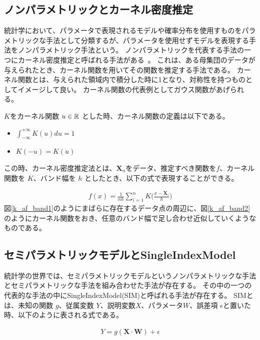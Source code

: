 \subsection{ノンパラメトリックとカーネル密度推定}
統計学において、パラメータで表現されるモデルや確率分布を使用すものをパラメトリックな手法として分類するが、パラメータを使用せずモデルを表現する手法をノンパラメトリック手法という。
ノンパラメトリックを代表する手法の一つにカーネル密度推定と呼ばれる手法がある~\cite{kernel_density}。
これは、ある母集団のデータが与えられたとき、カーネル関数を用いてその関数を推定する手法である。
カーネル関数とは、与えられた領域内で積分した時に1となり、対称性を持つものとしてイメージして良い。
カーネル関数の代表例としてガウス関数があげられる。

$ K $をカーネル関数 $ u \in \mathbb{R} $ とした時、カーネル関数の定義は以下である。

\begin{itemize}
  \item $ \int^{+ \infty}_{- \infty} K(u)du = 1 $
  \item $ K(-u) = K(u) $
\end{itemize}


この時、カーネル密度推定法とは、$ \mathbf{X}_n $をデータ、推定すべき関数を$ f $、カーネル関数を $ K $、バンド幅を $ h $ としたとき、以下の式で表現することができる。


\begin{eqnarray}
f(x) = \frac{1}{nh} \sum^n_{i=1}K \bigl( \frac{x - \mathbf{X}_i}{h}\bigr)
\label{eq:k-af}
\end{eqnarray}
図\ref{k_af_band1}のようにまばらに存在するデータ点の周辺に、図\ref{k_af_band2}のようにカーネル関数をおき、任意のバンド幅で足し合わせ近似していくようなものである。






\subsection{セミパラメトリックモデルとSingleIndexModel}

統計学の世界では、セミパラメトリックモデルというノンパラメトリックな手法とセミパラメトリックな手法を組み合わせた手法が存在する。
その中の一つの代表的な手法の中にSingleIndexModel(SIM)と呼ばれる手法が存在する。
SIMとは、未知の関数 $ g $、従属変数 $ Y $、説明変数$ X $、パラメータ$ W $、誤差項 $ \epsilon $と置いた時、以下のように表される式である。

\begin{eqnarray}
Y = g(\mathbf{X} \cdot  \mathbf{W}) + \epsilon
\label{eq:k-af}
\end{eqnarray}

